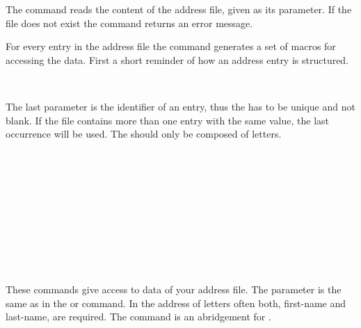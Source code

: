 \begin{Declaration}
\end{Declaration}%
%
%
The command  reads the content
of the address file, given as its parameter.
If the file does not exist the command returns an
error message.

For every entry in the address file the command generates a
set of macros for accessing the data. 
First a short reminder of how an address entry is structured.

\begin{Declaration}%
  \\
\end{Declaration}%
The last parameter is the identifier of an entry, thus the
 has to be unique and not blank.  If the file contains more
than one entry with the same  value, the last occurrence
will be used.  The  should only be composed of letters.
\begin{Declaration}
\\
\\
\\
\\
\\
\\
\\
\\
\\
\end{Declaration}%
%
%
%
%
%
These commands give access to data of your address file.
The parameter  is the same as in the
 or  command.
In the address of letters often both, first-name and
last-name, are required.
The command  is an abridgement for
 .

